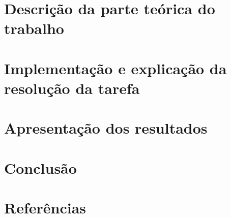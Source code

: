 \documentclass[aps,column,amsmath,amssymb,floatfix]{revtex4}
\begin{document}
\section{Descrição da parte teórica do trabalho}
\section{Implementação e explicação da resolução da tarefa}
\section{Apresentação dos resultados}

\section{Conclusão}
\section{Referências}
\end{document}
